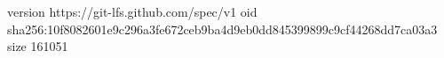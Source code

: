 version https://git-lfs.github.com/spec/v1
oid sha256:10f8082601e9c296a3fe672ceb9ba4d9eb0dd845399899c9cf44268dd7ca03a3
size 161051
